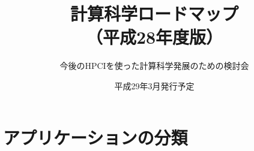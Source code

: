 \documentclass[11pt,a4paper]{jsbook}
\begin{document}
\title{計算科学ロードマップ\\
（平成28年度版）}
\author{今後のHPCIを使った計算科学発展のための検討会}
\date{平成29年3月発行予定}
\maketitle

\tableofcontents

\mainmatter



\setcounter{chapter}{2}
\chapter{アプリケーションの分類}


%

%
%
%
\end{document}
